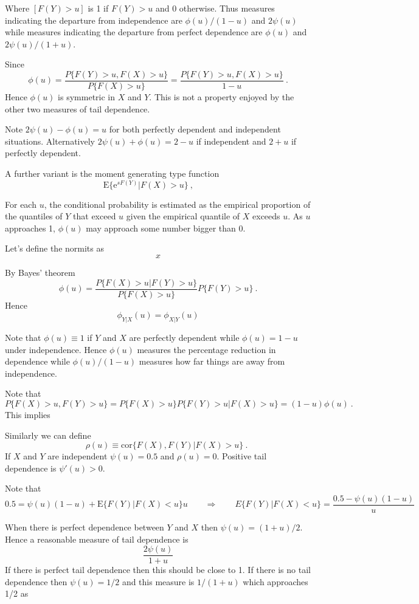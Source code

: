 \documentclass[a4paper,12pt]{article}
\newcommand{\E}{{\mathrm E}}
\newcommand{\e}{\mathrm{e}}
\begin{document}
Where $[F(Y)>u]$ is 1 if $F(Y)>u$ and 0 otherwise.
Thus measures indicating the departure from independence are
$
\phi(u)/(1-u)$ and $2\psi(u)$ while measures indicating the departure from perfect dependence are
$
\phi(u)$ and $2\psi(u)/(1+u)$.

Since
$$
\phi(u)=\frac{P\{F(Y)>u,F(X)>u\}}{P\{F(X)>u\}} = \frac{P\{F(Y)>u,F(X)>u\}}{1-u}\ .
$$
Hence $\phi(u)$ is symmetric in $X$ and $Y$.  This is not a property enjoyed by the other two measures of tail dependence.

Note $2\psi(u)-\phi(u)=u$ for both perfectly dependent and independent situations.  Alternatively $2\psi(u)+\phi(u)=2-u$ if independent and $2+u$ if perfectly dependent.

A further variant is the moment generating type function
$$
\E\{\e^{sF(Y)}|F(X)>u\}\ , \qquad \
$$


For each $u$, the conditional probability is estimated as the empirical proportion of the quantiles of $Y$ that exceed $u$ given the empirical quantile of $X$ exceeds $u$.  As $u$ approaches 1, $\phi(u)$ may approach some number bigger than 0.

Let's define the normits as
$$
x
$$

By Bayes' theorem
$$
\phi(u)= \frac{P\{F(X)>u|F(Y)>u\}}{P\{F(X)>u\}}P\{F(Y)>u\}\ .
$$
Hence
$$
\phi_{Y|X}(u)=\phi_{X|Y}(u)
$$

Note that $\phi(u)\equiv 1$ if $Y$ and $X$ are perfectly dependent while $\phi(u)=1-u$ under independence.   Hence $\phi(u)$ measures the percentage reduction in dependence while  $\phi(u)/(1-u)$ measures how far things are away from independence.

Note that
$$
P\{F(X)>u,F(Y)>u\}=P\{F(X)>u\}P\{F(Y)>u|F(X)>u\}=(1-u)\phi(u) \ .
$$
This implies

Similarly we can define
$$
\qquad \rho(u)\equiv \mathrm{cor}\{F(X),F(Y)|F(X)>u\}\ .
$$
If $X$ and $Y$ are independent $\psi(u)=0.5$ and $\rho(u)=0$.  Positive tail dependence is $\psi'(u)>0$.

Note that
$$
0.5=\psi(u)(1-u)+\E\{F(Y)|F(X)<u\}u\qquad\Rightarrow\qquad E\{F(Y)|F(X)<u\}=\frac{0.5-\psi(u)(1-u)}{u}
$$

When there is perfect dependence between $Y$ and $X$ then $\psi(u)=(1+u)/2$.  Hence a reasonable measure of tail
dependence is
$$
\frac{2\psi(u)}{1+u}
$$
If there is perfect tail dependence then this should be close to 1.   If there is no tail dependence then $\psi(u)=1/2$ and this measure is $1/(1+u)$ which approaches 1/2 as
\end{document}
